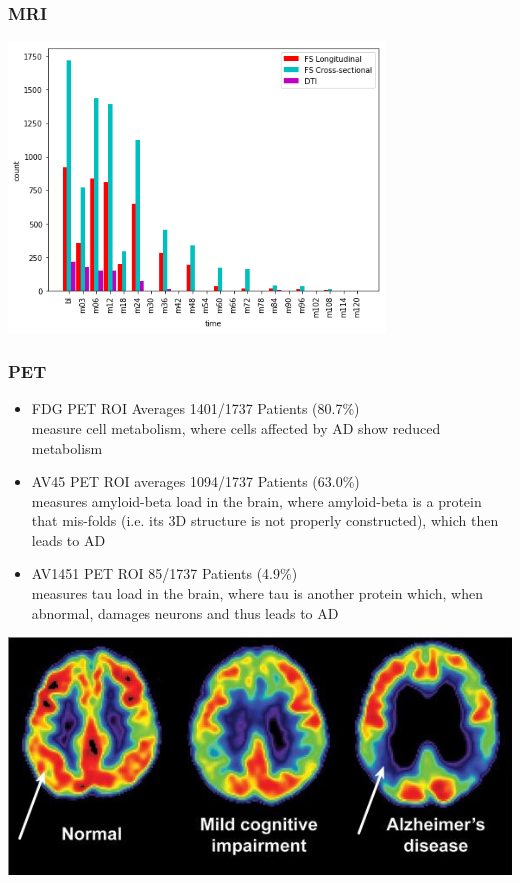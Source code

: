 \documentclass{beamer}
\begin{document}
    \begin{frame}
        \frametitle{MRI}
        \begin{center}
            \includegraphics[width=0.75\textwidth]{images/mri_times.png}
        \end{center}
    \end{frame}

    \begin{frame}
        \frametitle{PET}
        \begin{itemize}
            \item FDG PET ROI Averages \hfill 1401/1737 Patients (80.7\%)\\
            measure cell metabolism, where cells affected by AD show reduced metabolism
            \item AV45 PET ROI averages \hfill 1094/1737 Patients (63.0\%) \\
            measures amyloid-beta load in the brain, where amyloid-beta is a protein that mis-folds (i.e. its 3D structure is not properly constructed), which then leads to AD
            \item AV1451 PET ROI \hfill 85/1737 Patients (4.9\%)\\
            measures tau load in the brain, where tau is another protein which, when abnormal, damages neurons and thus leads to AD
        \end{itemize}
        \begin{center}
            \includegraphics[height=0.25\paperheight]{images/pet_image.jpg}
        \end{center}
    \end{frame}
\end{document}
